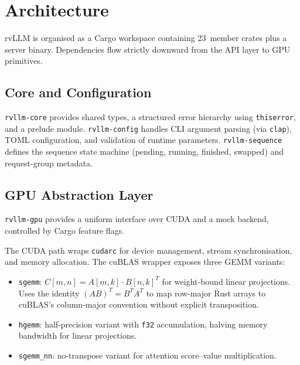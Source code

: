 \documentclass[11pt,a4paper]{article}
\begin{document}
\section{Architecture}
\label{sec:architecture}

rvLLM is organised as a Cargo workspace containing 23~member crates plus a server
binary. Dependencies flow strictly downward from the API layer to GPU primitives.

\subsection{Core and Configuration}

\texttt{rvllm-core} provides shared types, a structured error hierarchy using
\texttt{thiserror}, and a prelude module. \texttt{rvllm-config} handles CLI argument
parsing (via \texttt{clap}), TOML configuration, and validation of runtime
parameters. \texttt{rvllm-sequence} defines the sequence state machine
(pending, running, finished, swapped) and request-group metadata.

\subsection{GPU Abstraction Layer}

\texttt{rvllm-gpu} provides a uniform interface over CUDA and a mock backend,
controlled by Cargo feature flags.

The CUDA path wraps \texttt{cudarc} for device management, stream synchronisation,
and memory allocation. The cuBLAS wrapper exposes three GEMM variants:

\begin{itemize}
  \item \texttt{sgemm}: $C[m,n] = A[m,k] \cdot B[n,k]^T$ for weight-bound linear
        projections. Uses the identity $(AB)^T = B^T A^T$ to map row-major Rust arrays
        to cuBLAS's column-major convention without explicit transposition.
  \item \texttt{hgemm}: half-precision variant with \texttt{f32} accumulation, halving
        memory bandwidth for linear projections.
  \item \texttt{sgemm\_nn}: no-transpose variant for attention score--value
        multiplication.
\end{itemize}
\end{document}
